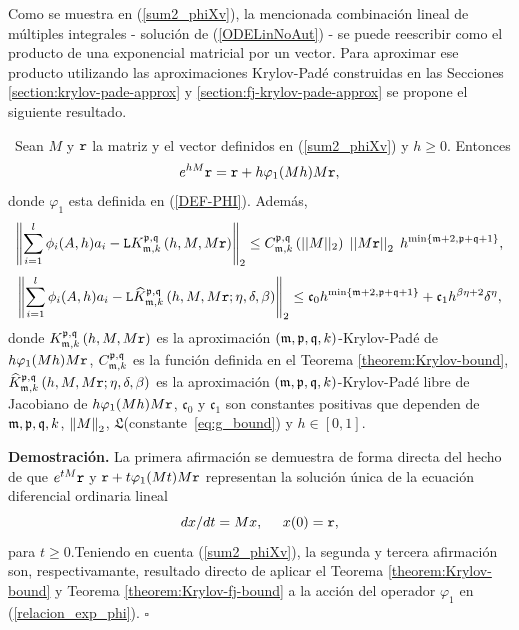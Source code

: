 Como se muestra en (\ref{sum2_phiXv}), la mencionada combinación lineal de múltiples integrales - solución de (\ref{ODELinNoAut}) - se puede reescribir como el producto de una exponencial matricial por un vector. Para aproximar ese producto utilizando las aproximaciones Krylov-Padé construidas en las Secciones \ref{section:krylov-pade-approx} y \ref{section:fj-krylov-pade-approx} se propone el siguiente resultado.

\begin{theorem} \label{theorem:Krylov-and-Krylov-fj-bounds}
	\cite{naranjo2023computing,naranjo2023RT}~Sean $M$ y $\mathtt{r}$ la matriz y el vector definidos en (\ref{sum2_phiXv}) y $h\geq 0$. Entonces
    \begin{equation} 
    	e^{hM}\mathtt{r} = \mathtt{r} + h\varphi_1 (Mh)M\mathtt{r}, \label{relacion_exp_phi}
    \end{equation}
	donde $\varphi_1$ esta definida en (\ref{DEF-PHI}). Además,
	\begin{equation}
      \left\Vert\sum\limits_{i=1}^{l}\phi _{i}(A,h)a_{i}-	\mathtt{L} K_{\mathfrak{m},k}^{\mathfrak{p},\mathfrak{q}}\left(h, M, M\mathtt{r} \right)
      \right\Vert_2 \leq C_{\mathfrak{m},k}^{\mathfrak{p},\mathfrak{q}}\left(\lvert\lvert M \rvert\rvert_2\right) \;
	  \left\lvert \left\lvert M\mathtt{r} \right\rvert \right\rvert_2 \; h^{\mathrm{min}\left\{ \mathfrak{m}+2,\mathfrak{p}+\mathfrak{q}+1 \right\}}, \label{phi_approx}
	\end{equation}
	\begin{equation}
		\left\Vert \sum\limits_{i=1}^{l}\phi _{i}(A,h)a_{i} - \mathtt{L} \widehat{K}_{\mathfrak{m},k}^{\mathfrak{p},\mathfrak{q}}\left(h, M , M\mathtt{r} ; \eta, \delta, \beta \right)
		\right\Vert_2 \leq \mathfrak{c}_0 h^{\min\{\mathfrak{m}+2,\mathfrak{p}+\mathfrak{q}+1\}} + \mathfrak{c}_1 h^{\beta\eta+2}\delta^{\eta}, \label{phi_approx_fj}
	\end{equation}
	donde $K_{\mathfrak{m},k}^{\mathfrak{p},\mathfrak{q}}\left(h, M, M\mathtt{r} \right)$ es la aproximación $(\mathfrak{m} , \mathfrak{p} ,\mathfrak{q} , k)$-Krylov-Padé de $h\varphi_1 (Mh)M\mathtt{r}$,  $C_{\mathfrak{m},k}^{\mathfrak{p},\mathfrak{q}}$ es la función definida en el Teorema \ref{theorem:Krylov-bound}, $\widehat{K}_{\mathfrak{m},k}^{\mathfrak{p},\mathfrak{q}}\left(h, M , M\mathtt{r} ; \eta, \delta, \beta \right)$  es la aproximación $(\mathfrak{m} , \mathfrak{p} ,\mathfrak{q} , k)$-Krylov-Padé libre de Jacobiano de $h\varphi_1 (Mh)M\mathtt{r}$, $\mathfrak{c}_0$ y $\mathfrak{c}_1$ son constantes positivas que dependen de $\mathfrak{m},\mathfrak{p},\mathfrak{q},k$, $\left\lVert M \right\rVert_2$, $\mathfrak{L}$(constante~\ref{eq:g_bound}) y $h \in [0,1]$.
\end{theorem}
\textbf{Demostración.} La primera afirmación se demuestra de forma directa del hecho de que $e^{tM}\mathtt{r}$ y $\mathtt{r} + t\varphi_1 (Mt)M\mathtt{r}$ representan la solución única de la ecuación diferencial ordinaria lineal
\begin{equation}
	dx/dt= Mx,  \;\;\;\;\; x(0)=\mathtt{r}, \label{eq:lineal-eq-dem}
\end{equation}
para $t\geq0$.Teniendo en cuenta (\ref{sum2_phiXv}), la segunda y tercera afirmación son, respectivamante, resultado directo de aplicar el Teorema \ref{theorem:Krylov-bound} y Teorema \ref{theorem:Krylov-fj-bound} a la acción del operador $\varphi_1$ en (\ref{relacion_exp_phi}).
$\square$

